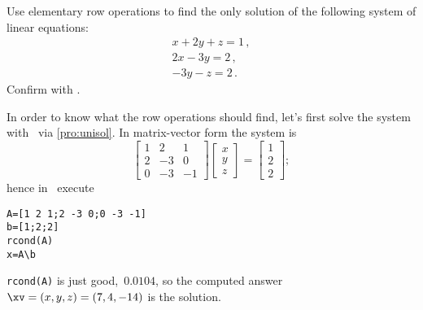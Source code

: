 \begin{example} \label{eg:erowops}
Use elementary row operations to find the only solution of the following system of linear equations:
\begin{equation*}
\begin{array}{l}
x+2y+z=1\,,\\ 2x-3y=2\,,\\ -3y-z=2\,.
\end{array}
\end{equation*}
Confirm with \script.
\begin{solution} 
In order to know what the row operations should find, let's first solve the system with \script\ via \autoref{pro:unisol}. 
In matrix-vector form the system is
\begin{equation*}
\begin{bmatrix} 1&2&1\\2&-3&0\\0&-3&-1 \end{bmatrix}
\begin{bmatrix} x\\y\\z \end{bmatrix}
=\begin{bmatrix} 1\\2\\2 \end{bmatrix};
\end{equation*}
hence in \script\ execute
\begin{verbatim}
A=[1 2 1;2 -3 0;0 -3 -1]
b=[1;2;2]
rcond(A)
x=A\b
\end{verbatim}
\setbox\ajrqrbox\hbox{}%
\marginpar{\usebox{\ajrqrbox\\[2ex]}}%
\verb|rcond(A)| is just good,~\(0.0104\), so the computed answer \(\xv=(x,y,z)=(7,4,-14)\) is the solution.


\end{solution}
\end{example}
